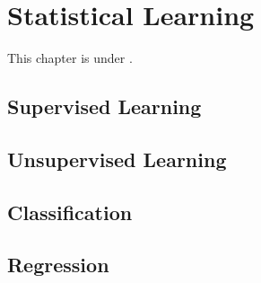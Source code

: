 \chapter{Statistical Learning}
This chapter is under \work.

\section{Supervised Learning}
\section{Unsupervised Learning}
\section{Classification}
\section{Regression}

